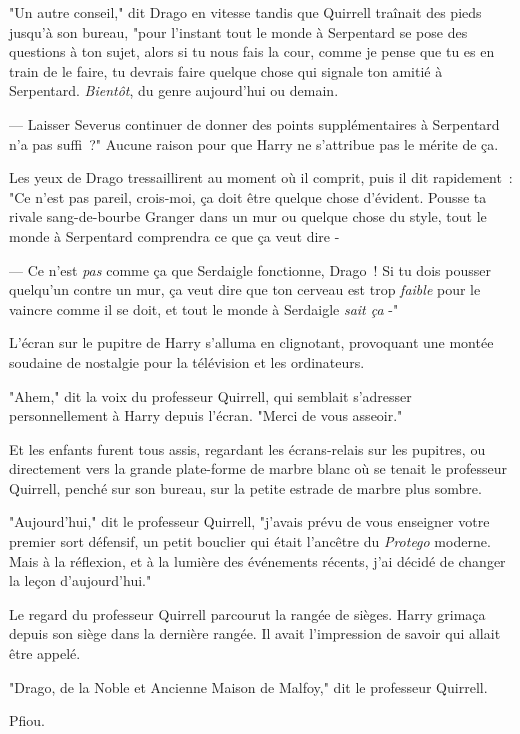 "Un autre conseil," dit Drago en vitesse tandis que Quirrell traînait des pieds jusqu'à son bureau, "pour l'instant tout le monde à Serpentard se pose des questions à ton sujet, alors si tu nous fais la cour, comme je pense que tu es en train de le faire, tu devrais faire quelque chose qui signale ton amitié à Serpentard. \emph{Bientôt}, du genre aujourd'hui ou demain.

--- Laisser Severus continuer de donner des points supplémentaires à Serpentard n'a pas suffi~?" Aucune raison pour que Harry ne s'attribue pas le mérite de ça.

Les yeux de Drago tressaillirent au moment où il comprit, puis il dit rapidement~: "Ce n'est pas pareil, crois-moi, ça doit être quelque chose d'évident. Pousse ta rivale sang-de-bourbe Granger dans un mur ou quelque chose du style, tout le monde à Serpentard comprendra ce que ça veut dire -

--- Ce n'est \emph{pas} comme ça que Serdaigle fonctionne, Drago~! Si tu dois pousser quelqu'un contre un mur, ça veut dire que ton cerveau est trop \emph{faible} pour le vaincre comme il se doit, et tout le monde à Serdaigle \emph{sait ça} -"

L'écran sur le pupitre de Harry s'alluma en clignotant, provoquant une montée soudaine de nostalgie pour la télévision et les ordinateurs.

"Ahem," dit la voix du professeur Quirrell, qui semblait s'adresser personnellement à Harry depuis l'écran. "Merci de vous asseoir."

\later

Et les enfants furent tous assis, regardant les écrans-relais sur les pupitres, ou directement vers la grande plate-forme de marbre blanc où se tenait le professeur Quirrell, penché sur son bureau, sur la petite estrade de marbre plus sombre.

"Aujourd'hui," dit le professeur Quirrell, "j'avais prévu de vous enseigner votre premier sort défensif, un petit bouclier qui était l'ancêtre du \emph{Protego} moderne. Mais à la réflexion, et à la lumière des événements récents, j'ai décidé de changer la leçon d'aujourd'hui."

Le regard du professeur Quirrell parcourut la rangée de sièges. Harry grimaça depuis son siège dans la dernière rangée. Il avait l'impression de savoir qui allait être appelé.

"Drago, de la Noble et Ancienne Maison de Malfoy," dit le professeur Quirrell.

Pfiou.

